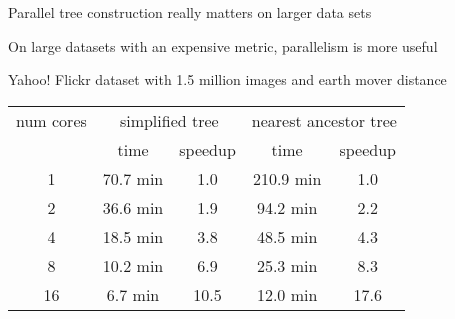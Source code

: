 
\begin{frame}[fragile]{Parallel tree construction really matters on larger data sets}



\vspace{0.1in}
On large datasets with an expensive metric, parallelism is more useful

\vspace{0.15in}
Yahoo! Flickr dataset with 1.5 million images and earth mover distance

\vspace{0.15in}
\begin{center}
\Large
\begin{tabular}{ccccc}
\hline
num cores
 & \multicolumn{2}{c}{simplified tree} & \multicolumn{2}{c}{nearest ancestor tree} \\
& time & speedup & time & speedup \\
\hline
\hline
1  & 70.7 min & 1.0 & 210.9 min& 1.0\\
2  & 36.6 min & 1.9 & 94.2 min & 2.2\\
4  & 18.5 min & 3.8 & 48.5 min & 4.3\\
8  & 10.2 min & 6.9 & 25.3 min & 8.3\\
16 & 6.7 min & 10.5 & 12.0 min & 17.6\\
\hline
\end{tabular}
\end{center}

\end{frame}


